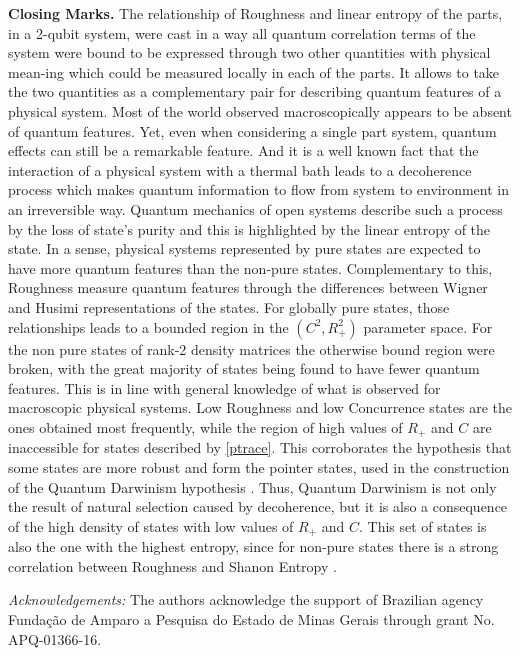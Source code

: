 \documentclass[aps,prl,preprint]{revtex4-1}
\begin{document}
	\textbf{Closing Marks.} The relationship of Roughness and linear entropy of the parts, in a 2-qubit system, were cast in a way all quantum correlation terms of the system were bound to be expressed through two other quantities with physical mean-ing which could be measured locally in each of the parts. It allows to take
	the two quantities as a complementary pair for describing quantum
	features of a physical system. Most of the world observed macroscopically appears
	to be absent of quantum features. 
	Yet, even when considering a single part system, quantum
	effects can still be a remarkable feature. And it is 
	a well known fact that the interaction of a physical system
	with a thermal bath leads to a decoherence process which makes 
	quantum  information to flow from system to environment 
	in an irreversible way. Quantum mechanics of open systems describe 
	such a process by the loss of state's purity and this is highlighted 
	by the linear entropy of the state.
	In a sense, physical systems represented by pure states
	are expected to have more quantum features than the non-pure
	states. Complementary to this, Roughness measure quantum features
	through the differences between Wigner and Husimi representations
	of the states. For globally pure states, those relationships leads
	to a bounded region in the $(C^2, R_+^2)$ parameter space. For the 
	non pure states of rank-2 density matrices the otherwise bound region
	were broken, with the great majority of states being found to have fewer
	quantum features. This is in line with general knowledge of 
	what is observed for macroscopic physical systems.
Low	Roughness and low Concurrence states are the ones obtained most frequently, while the region of high values of $R_+$ and $C$ are inaccessible for states described by \eqref{ptrace}. This corroborates the hypothesis that some states are more robust and form the pointer states, used in the construction of the Quantum Darwinism hypothesis \cite{Zurek}. Thus, Quantum Darwinism is not only the result of natural selection caused by decoherence, but it is also a consequence of the high density of states with low values of $R_+$ and $C$. This set of states is also the one with the highest entropy, since for non-pure states there is a strong correlation between Roughness and Shanon Entropy \cite{Lemos2018}.
	
	\textit{Acknowledgements:} The authors acknowledge the support of Brazilian agency Fundação de Amparo a Pesquisa do Estado de Minas Gerais through grant No. APQ-01366-16. 
	
\end{document}
